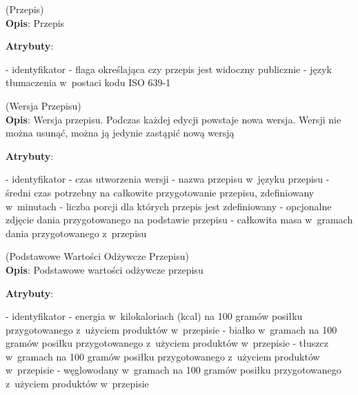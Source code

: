 \begin{enumerate}[label={\textbf{KAT/3/\protect\twodigits{\theenumi}}}, wide, labelwidth=!, labelindent=0pt, labelsep=0pt, series=reqs]
    \setlength\itemsep{1.75em}
    \label{kat:Recipe} (Przepis)\\
    \indent\textbf{Opis}: Przepis
    \par
    \textbf{Atrybuty}:
    \begin{itemize}[series=atr, wide, align=left, leftmargin=190pt]
        \label{kat:Recipe:id}- identyfikator
        \label{kat:Recipe:isPublic}- flaga określająca czy przepis jest widoczny publicznie
        \label{kat:Recipe:language}- język tłumaczenia w~postaci kodu ISO 639-1
    \end{itemize}

    \label{kat:RecipeVersion} (Wersja Przepisu)\\
    \indent\textbf{Opis}: Wersja przepisu. Podczas każdej edycji powstaje nowa wersja. Wersji nie można usunąć, można ją jedynie zastąpić nową wersją
    \par
    \textbf{Atrybuty}:
    \begin{itemize}[series=atr, wide, align=left, leftmargin=190pt]
        \label{kat:RecipeVersion:id}- identyfikator
        \label{kat:RecipeVersion:editTimestamp}- czas utworzenia wersji
        \label{kat:RecipeVersion:name}- nazwa przepisu w~języku przepisu
        \label{kat:RecipeVersion:preparationTimeMinutes}- średni czas potrzebny na całkowite przygotowanie przepisu, zdefiniowany w~minutach
        \label{kat:RecipeVersion:numberOfPortions}- liczba porcji dla których przepis jest zdefiniowany
        \label{kat:RecipeVersion:image}- opcjonalne zdjęcie dania przygotowanego na podstawie przepisu
        \label{kat:RecipeVersion:totalGramsWeight}- całkowita masa w~gramach dania przygotowanego z~przepisu
    \end{itemize}

    \label{kat:RecipeBasicNutritionData} (Podstawowe Wartości Odżywcze Przepisu)\\
    \indent\textbf{Opis}: Podstawowe wartości odżywcze przepisu
    \par
    \textbf{Atrybuty}:
    \begin{itemize}[series=atr, wide, align=left, leftmargin=190pt]
        \label{kat:RecipeBasicNutritionData:id}- identyfikator
        \label{kat:RecipeBasicNutritionData:energy}- energia w~kilokaloriach (kcal) na 100 gramów posiłku przygotowanego z~użyciem produktów w~przepisie
        \label{kat:RecipeBasicNutritionData:protein}- białko w~gramach na 100 gramów posiłku przygotowanego z~użyciem produktów w~przepisie
        \label{kat:RecipeBasicNutritionData:fat}- tłuszcz w~gramach na 100 gramów posiłku przygotowanego z~użyciem produktów w~przepisie
        \label{kat:RecipeBasicNutritionData:carbohydrates}- węglowodany w~gramach na 100 gramów posiłku przygotowanego z~użyciem produktów w~przepisie
    \end{itemize}


\end{enumerate}
